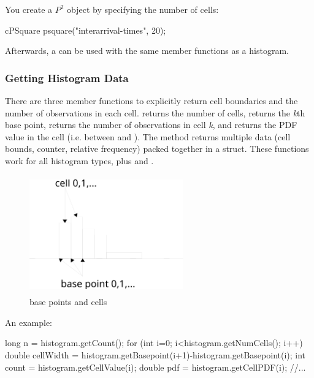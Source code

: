 You create a $P^{2}$ object by specifying the number of cells:

\begin{cpp}
cPSquare psquare("interarrival-times", 20);
\end{cpp}

Afterwards, a  can be used with the same member functions
as a histogram.


\subsubsection{Getting Histogram Data}


There are three member functions to explicitly return cell boundaries
and the number of observations in each cell.  returns
the number of cells,  returns the
\textit{k}th base point,  returns the
number of observations in cell \textit{k}, and
 returns the PDF value in the cell
(i.e. between  and
).
The  method returns multiple data
(cell bounds, counter, relative frequency) packed together in a struct.
These functions work for all histogram types, plus 
and .

\begin{figure}[htbp]
  \begin{center}
    \includegraphics[width=2.615in, height=2.001in]{figures/simlib-histogramcells}
    \caption{base points and cells}
  \end{center}
\end{figure}

An example:

\begin{cpp}
long n = histogram.getCount();
for (int i=0; i<histogram.getNumCells(); i++)
{
  double cellWidth = histogram.getBasepoint(i+1)-histogram.getBasepoint(i);
  int count = histogram.getCellValue(i);
  double pdf = histogram.getCellPDF(i);
  //...
}
\end{cpp}


